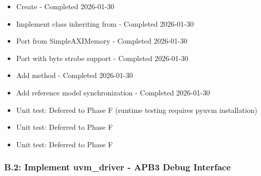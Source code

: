 \begin{record}

\begin{itemize}
\tightlist
\item[$\boxtimes$]
  Create  - Completed
  2026-01-30
\item[$\boxtimes$]
  Implement  class inheriting from
   - Completed 2026-01-30
\item[$\boxtimes$]
  Port  from SimpleAXIMemory - Completed
  2026-01-30
\item[$\boxtimes$]
  Port  with byte strobe support - Completed
  2026-01-30
\item[$\boxtimes$]
  Add  method - Completed 2026-01-30
\item[$\boxtimes$]
  Add reference model synchronization - Completed 2026-01-30
\item[$\boxtimes$]
  Unit test: Deferred to Phase F (runtime testing requires pyuvm
  installation)
\item[$\boxtimes$]
  Unit test: Deferred to Phase F
\item[$\boxtimes$]
  Unit test: Deferred to Phase F
\end{itemize}

\end{record}

\subsubsection{\texorpdfstring{B.2: Implement uvm\_\allowbreak{}driver -
APB3 Debug
Interface}{B.2: Implement uvm\_driver - APB3 Debug Interface}}\label{cr:status:pyuvm-migration:b2-implement-uvm-driver-apb3-debug-interface}


